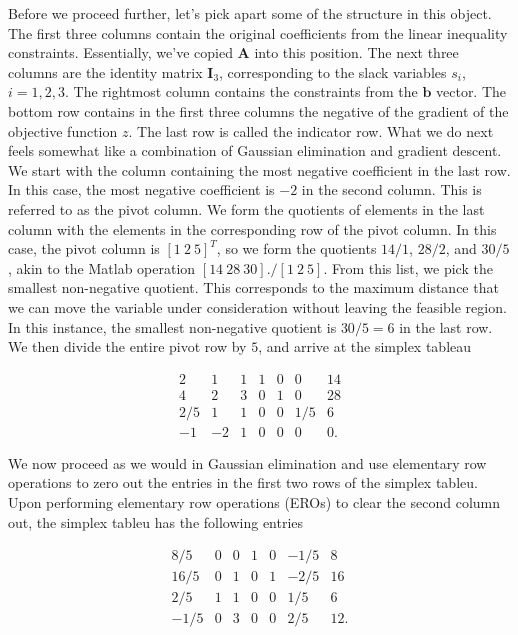 \documentclass[12pt,english]{article}
\begin{document}
Before we proceed further, let's pick apart some of the structure in this object.  The first three columns contain the original coefficients from the linear inequality constraints.  Essentially, we've copied $\mathbf{A}$ into this position.  The next three columns are the identity matrix $\mathbf{I}_3$, corresponding to the slack variables $s_i$, $i=1, 2, 3.$  The rightmost column contains the constraints from the $\mathbf{b}$ vector.  The bottom row contains in the first three columns the negative of the gradient of the objective function $z$.  The last row is called the indicator row.   What we do next feels somewhat like a combination of Gaussian elimination and gradient descent.  We start with the column containing the most negative coefficient in the last row.  In this case, the most negative coefficient is $-2$ in the second column.  This is referred to as the pivot column.   We form the quotients of elements in the last column with the elements in the corresponding row of the pivot column.  In this case, the pivot column is $[1 ~2 ~5]^T$, so we form the quotients $14/1$, $28/2$, and $30/5$, akin to the Matlab operation $[14 ~28 ~30]./[1 ~2 ~5]$.  From this list, we pick the smallest non-negative quotient.  This corresponds to the maximum distance that we can move the variable under consideration without leaving the feasible region. In this instance, the smallest non-negative quotient is $30/5 = 6$ in the last row.   We then divide the entire pivot row by $5$, and arrive at the simplex tableau

\begin{equation}
\begin{array}{cccccc|c}
2 	&	1	& 	1 	& 	1	& 	0	&	0	&	14 \\
4	&	2	& 	3	&	0	&	1	&	0	&	28 \\
2/5	&	1	&	1	&	0	&	0	& 	1/5	& 	6  \\
\hline
-1	& 	-2	&	1	& 	0	&	0	&	0	&	0.
\end{array}
\end{equation}

We now proceed as we would in Gaussian elimination and use elementary row operations to zero out the entries in the first two rows of the simplex tableu.   Upon performing elementary row operations (EROs) to clear the second column out, the simplex tableu has the following entries

\begin{equation}
\begin{array}{cccccc|c}
8/5 	&	0	&	0	&	1	&	0	&	-1/5 	&	8 \\
16/5	&	0	&	1	&	0	&	1	&	-2/5	&	16 \\
2/5	&	1	&	1	&	0	&	0	&	1/5	&	6 \\
\hline
-1/5	&	0	&	3	&	0	&	0	&	2/5	&	12.
\end{array}
\end{equation}
\end{document}
